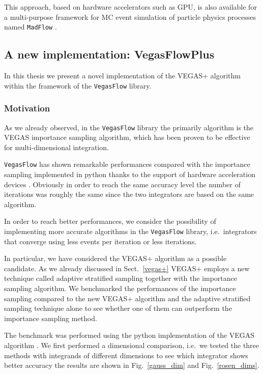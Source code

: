 \documentclass[../main/main.tex]{subfiles}
\begin{document}
This approach, based on hardware accelerators such as GPU, is also available for a multi-purpose framework for MC event simulation of particle physics processes named 	\texttt{MadFlow} \cite{Carrazza:2021gpx, Carrazza:2021zug}.

 
 
 
 
\subsection{A new implementation: VegasFlowPlus}
In this thesis we present a novel implementation of the VEGAS+ algorithm within the framework of the \texttt{VegasFlow} library.
\subsubsection{Motivation}
As we already observed, in the \texttt{VegasFlow} library the primarily algorithm is the VEGAS importance sampling algorithm, which has been proven to be effective for multi-dimensional integration.

\texttt{VegasFlow} has shown remarkable performances compared with the importance sampling  implemented in python \cite{peter_lepage_2021_4746454} thanks to the support of hardware acceleration devices . Obviously in order to reach the same accuracy level the number of iterations was roughly the same since the two integrators are based on the same algorithm.

In order to reach better performances, we consider the possibility of implementing more accurate algorithms in the \texttt{VegasFlow} library, i.e.\ integrators that converge using less events per iteration or less iterations. 

In particular, we have considered the VEGAS+ algorithm as a possible candidate. 
As we already discussed in Sect.~\ref{vegas+} VEGAS+ employs a new technique called adaptive stratified sampling together with the importance sampling algorithm. 
We benchmarked the performances of the importance sampling compared to the new VEGAS+ algorithm and the adaptive stratified sampling technique alone to see whether one of them can outperform the importance sampling method.

The benchmark was performed using the python implementation of the VEGAS algorithm \cite{peter_lepage_2021_4746454}.
We first performed a dimensional comparison, i.e.\ we tested the three methods with integrands of different dimensions to see which integrator shows better accuracy the results are shown in Fig.~\ref{gauss_dim} and Fig.~\ref{rosen_dims}.
\end{document}
